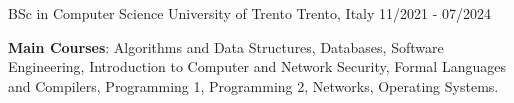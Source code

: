 
\begin{cventries}

	\cventry
	{BSc in Computer Science} %
	{University of Trento} %
	{Trento, Italy} %
	{11/2021 - 07/2024} %
	{
		\begin{cvitems} %
			\item \textbf{Main Courses}: Algorithms and Data Structures, Databases, Software Engineering, Introduction to Computer and Network Security, Formal Languages and Compilers, Programming 1, Programming 2, Networks, Operating Systems.
		\end{cvitems}
	}

\end{cventries}
